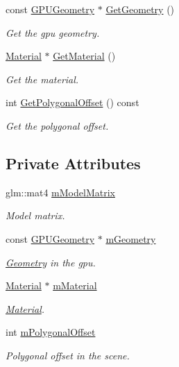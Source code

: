 \begin{DoxyCompactItemize}
const \hyperlink{class_g_p_u_geometry}{G\+P\+U\+Geometry} $\ast$ \hyperlink{class_g_p_u_scene_node_aa4066ee90cac063e5eee6def5d6d9099}{Get\+Geometry} ()
\begin{DoxyCompactList}\small\item\em Get the gpu geometry. \end{DoxyCompactList}\item 
\hyperlink{class_material}{Material} $\ast$ \hyperlink{class_g_p_u_scene_node_a5969395762b1a85e2d937baa80d9d0e7}{Get\+Material} ()
\begin{DoxyCompactList}\small\item\em Get the material. \end{DoxyCompactList}\item 
int \hyperlink{class_g_p_u_scene_node_a13fcf7a78ef28888a9cce449de8b60b7}{Get\+Polygonal\+Offset} () const 
\begin{DoxyCompactList}\small\item\em Get the polygonal offset. \end{DoxyCompactList}\end{DoxyCompactItemize}
\subsection*{Private Attributes}
\begin{DoxyCompactItemize}
\item 
glm\+::mat4 \hyperlink{class_g_p_u_scene_node_a44bf9ca8c8c92e4dce8498d0d1affd9d}{m\+Model\+Matrix}
\begin{DoxyCompactList}\small\item\em Model matrix. \end{DoxyCompactList}\item 
const \hyperlink{class_g_p_u_geometry}{G\+P\+U\+Geometry} $\ast$ \hyperlink{class_g_p_u_scene_node_a5b5aecbfe949586c29750fef629ef671}{m\+Geometry}
\begin{DoxyCompactList}\small\item\em \hyperlink{class_geometry}{Geometry} in the gpu. \end{DoxyCompactList}\item 
\hyperlink{class_material}{Material} $\ast$ \hyperlink{class_g_p_u_scene_node_af6fe090714f9a4d8ad409bed646a12a2}{m\+Material}
\begin{DoxyCompactList}\small\item\em \hyperlink{class_material}{Material}. \end{DoxyCompactList}\item 
int \hyperlink{class_g_p_u_scene_node_a4625ba124b15ebd9159a633b57c98165}{m\+Polygonal\+Offset}
\begin{DoxyCompactList}\small\item\em Polygonal offset in the scene. \end{DoxyCompactList}\end{DoxyCompactItemize}


